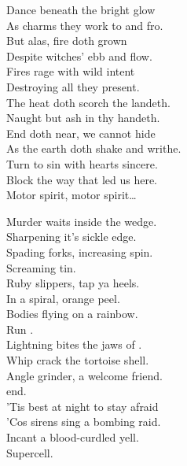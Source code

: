 Dance beneath the  bright glow \\
As charms they work to and fro. \\
But alas, fire doth grown \\
Despite witches' ebb and flow. \\
Fires rage with wild intent \\
Destroying all they present. \\
The heat doth scorch the landeth. \\
Naught but ash in thy handeth. \\

End doth near, we cannot hide \\
As the earth doth shake and writhe. \\
Turn to sin with hearts sincere. \\
Block the way that led us here. \\

Motor spirit, motor spirit… \\




Murder waits inside the wedge. \\
Sharpening it's sickle edge. \\
Spading forks, increasing spin. \\
Screaming tin. \\
Ruby slippers, tap ya heels. \\
In a spiral, orange peel. \\
Bodies flying on a rainbow. \\
Run . \\

Lightning bites the jaws of . \\
Whip crack the tortoise shell. \\
Angle grinder, a welcome friend. \\
 end. \\
'Tis best at night to stay afraid \\
'Cos sirens sing a bombing raid. \\
Incant a blood-curdled yell. \\
Supercell. \\

